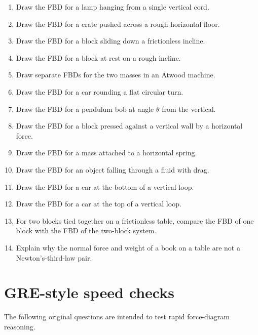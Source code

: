 \begin{enumerate}
\item Draw the FBD for a lamp hanging from a single vertical cord.
\item Draw the FBD for a crate pushed across a rough horizontal floor.
\item Draw the FBD for a block sliding down a frictionless incline.
\item Draw the FBD for a block at rest on a rough incline.
\item Draw separate FBDs for the two masses in an Atwood machine.
\item Draw the FBD for a car rounding a flat circular turn.
\item Draw the FBD for a pendulum bob at angle $\theta$ from the vertical.
\item Draw the FBD for a block pressed against a vertical wall by a horizontal force.
\item Draw the FBD for a mass attached to a horizontal spring.
\item Draw the FBD for an object falling through a fluid with drag.
\item Draw the FBD for a car at the bottom of a vertical loop.
\item Draw the FBD for a car at the top of a vertical loop.
\item For two blocks tied together on a frictionless table, compare the FBD of one block with the FBD of the two-block system.
\item Explain why the normal force and weight of a book on a table are not a Newton's-third-law pair.
\end{enumerate}

\section{GRE-style speed checks}

The following original questions are intended to test rapid force-diagram reasoning.

